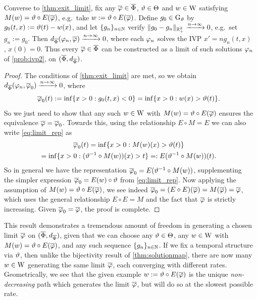 \begin{theorem}\label{cor:construct_limit}
    Converse to \autoref{thm:exit_limit}, fix any $\overline{\varphi}\in\overline{\Phi}$, $\vartheta\in\Theta$ and $w\in\mathrm{W}$ satisfying $M(w)=\vartheta\circ E(\overline{\varphi})$, e.g.~take $w:=\vartheta\circ E(\overline{\varphi})$. Define $g_0\in\mathrm{G}_\vartheta$ by $g_0(t,x):=\vartheta(t)-w(x)$, and let $\{g_n\}_{n\in\mathbb{N}}$ verify $\Vert g_0-g_n\Vert_{\mathbb{R}_+^2}\xrightarrow{n\to\infty}0$, e.g.~set $g_n:=g_0$. Then $d_{\overline{\Phi}}(\varphi_n,\overline{\varphi}) \xrightarrow{n\to\infty} 0$, where each $\varphi_n$ solves the IVP $x'=ng_n(t,x)$, $x(0)=0$. Thus every $\overline{\varphi}\in\overline{\Phi}$ can be constructed as a limit of such solutions $\varphi_n$ of \autoref{prob:ivp2}, on $(\overline{\Phi},d_{\overline{\Phi}})$.
\end{theorem}
\begin{proof}
    The conditions of \autoref{thm:exit_limit} are met, so we obtain $d_{\overline{\Phi}}(\varphi_n,\overline{\varphi}_0) \xrightarrow{n\to\infty} 0$, where
    \begin{equation}\label{eq:limit_rep}
        \overline{\varphi}_0(t):=\inf\{x>0:g_0(t,x)<0\} = \inf\{x>0:w(x)>\vartheta(t)\}.
    \end{equation}
    So we just need to show that any such $w\in\mathrm{W}$ with $M(w)=\vartheta\circ E(\overline{\varphi})$ ensures the equivalence $\overline{\varphi} = \overline{\varphi}_0$. Towards this, using the relationship $E\circ M=E$ we can also write \autoref{eq:limit_rep} as
    \begin{multline}\label{eq:limit_rep2}
        \overline{\varphi}_0(t) = \inf\{x>0:M(w)(x)>\vartheta(t)\} \\ = \inf\{x>0:(\vartheta^{-1}\circ M(w))(x)>t\}=:E (\vartheta^{-1}\circ M(w))(t).
    \end{multline}
    So in general we have the representation $\overline{\varphi}_0 = E(\vartheta^{-1}\circ M(w))$, supplementing the simpler expression $\overline{\varphi}_0=E(w)\circ\vartheta$ from \autoref{eq:limit_rep}. Now applying the assumption of $M(w)=\vartheta\circ E(\overline{\varphi})$, we see indeed $\overline{\varphi}_0=(E\circ E)(\overline{\varphi})=M(\overline{\varphi})=\overline{\varphi}$, which uses the general relationship $E\circ E=M$ and the fact that $\overline{\varphi}$ is strictly increasing. Given $\overline{\varphi}_0=\overline{\varphi}$, the proof is complete.
\end{proof}

This result demonstrates a tremendous amount of freedom in generating a chosen limit $\overline{\varphi}$ on $(\overline{\Phi},d_{\overline{\Phi}})$, given that we can choose any $\vartheta\in\Theta$, any $w\in\mathrm{W}$ with $M(w)=\vartheta\circ E(\overline{\varphi})$, and any such sequence $\{g_n\}_{n\in\mathbb{N}}$. If we fix a temporal structure via $\vartheta$, then unlike the bijectivity result of \autoref{thm:solutionmap}, there are now many $w\in\mathrm{W}$ generating the same limit $\overline{\varphi}$, each converging with different rates. Geometrically, we see that the given example $w:=\vartheta\circ E(\overline{\varphi})$ is the unique \emph{non-decreasing} path which generates the limit $\overline{\varphi}$, but will do so at the slowest possible rate.

